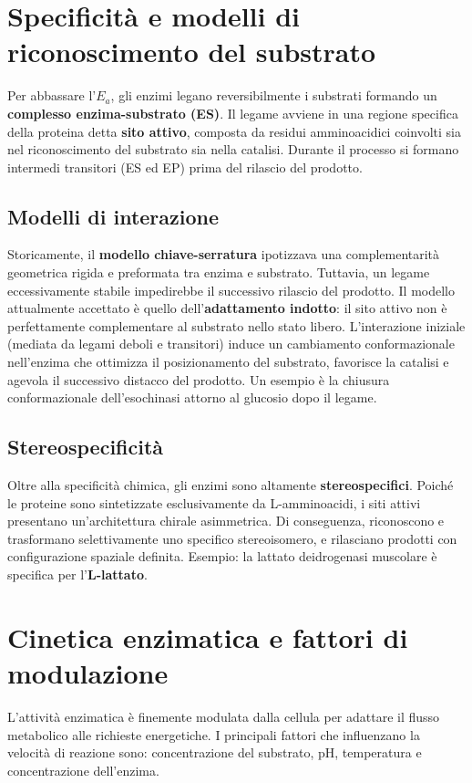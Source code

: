 \documentclass[12pt,a4paper]{report}
\begin{document}
\section{Specificità e modelli di riconoscimento del substrato}
Per abbassare l'\(E_a\), gli enzimi legano reversibilmente i substrati formando un \textbf{complesso enzima-substrato (ES)}. Il legame avviene in una regione specifica della proteina detta \textbf{sito attivo}, composta da residui amminoacidici coinvolti sia nel riconoscimento del substrato sia nella catalisi. Durante il processo si formano intermedi transitori (ES ed EP) prima del rilascio del prodotto.
\subsection{Modelli di interazione}
Storicamente, il \textbf{modello chiave-serratura} ipotizzava una complementarità geometrica rigida e preformata tra enzima e substrato. Tuttavia, un legame eccessivamente stabile impedirebbe il successivo rilascio del prodotto.
Il modello attualmente accettato è quello dell'\textbf{adattamento indotto}: il sito attivo non è perfettamente complementare al substrato nello stato libero. L'interazione iniziale (mediata da legami deboli e transitori) induce un cambiamento conformazionale nell'enzima che ottimizza il posizionamento del substrato, favorisce la catalisi e agevola il successivo distacco del prodotto. Un esempio è la chiusura conformazionale dell'esochinasi attorno al glucosio dopo il legame.
\subsection{Stereospecificità}
Oltre alla specificità chimica, gli enzimi sono altamente \textbf{stereospecifici}. Poiché le proteine sono sintetizzate esclusivamente da L-amminoacidi, i siti attivi presentano un'architettura chirale asimmetrica. Di conseguenza, riconoscono e trasformano selettivamente uno specifico stereoisomero, e rilasciano prodotti con configurazione spaziale definita. Esempio: la lattato deidrogenasi muscolare è specifica per l'\textbf{L-lattato}.

\section{Cinetica enzimatica e fattori di modulazione}
L'attività enzimatica è finemente modulata dalla cellula per adattare il flusso metabolico alle richieste energetiche. I principali fattori che influenzano la velocità di reazione sono: concentrazione del substrato, pH, temperatura e concentrazione dell'enzima.
\end{document}
